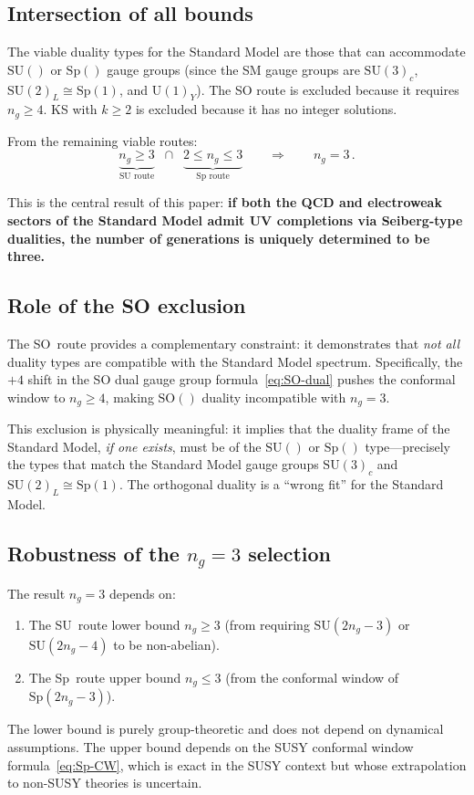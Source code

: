 \documentclass[11pt,a4paper]{article}
\theoremstyle{plain}
\theoremstyle{definition}
\theoremstyle{remark}
\newcommand{\ngen}{n_g}
\newcommand{\SU}[1]{\mathrm{SU}(#1)}
\newcommand{\UU}[1]{\mathrm{U}(#1)}
\newcommand{\SO}[1]{\mathrm{SO}(#1)}
\newcommand{\Sp}[1]{\mathrm{Sp}(#1)}
\begin{document}
\subsection{Intersection of all bounds}

The viable duality types for the Standard Model are those that can
accommodate $\SU{}$ or $\Sp{}$ gauge groups (since the SM gauge groups
are $\SU{3}_c$, $\SU{2}_L \cong \Sp{1}$, and $\UU{1}_Y$).  The SO
route is excluded because it requires $\ngen \geq 4$.  KS with $k \geq 2$
is excluded because it has no integer solutions.

From the remaining viable routes:
\begin{equation}\label{eq:intersection}
  \underbrace{\ngen \geq 3}_{\text{SU route}}
  \;\;\cap\;\;
  \underbrace{2 \leq \ngen \leq 3}_{\text{Sp route}}
  \qquad\Longrightarrow\qquad
  \boxed{\ngen = 3}\,.
\end{equation}

This is the central result of this paper: \textbf{if both the QCD and
electroweak sectors of the Standard Model admit UV completions via
Seiberg-type dualities, the number of generations is uniquely determined
to be three.}

\subsection{Role of the SO exclusion}

The SO~route provides a complementary constraint: it demonstrates that
\emph{not all} duality types are compatible with the Standard Model
spectrum.  Specifically, the $+4$ shift in the SO dual gauge group
formula~\eqref{eq:SO-dual} pushes the conformal window to $\ngen \geq 4$,
making $\SO{}$ duality incompatible with $\ngen = 3$.

This exclusion is physically meaningful: it implies that the duality
frame of the Standard Model, \emph{if one exists}, must be of the
$\SU{}$ or $\Sp{}$ type---precisely the types that match the Standard
Model gauge groups $\SU{3}_c$ and $\SU{2}_L \cong \Sp{1}$.  The
orthogonal duality is a ``wrong fit'' for the Standard Model.

\subsection{Robustness of the $\ngen = 3$ selection}

The result $\ngen = 3$ depends on:
\begin{enumerate}
  \item The SU~route lower bound $\ngen \geq 3$ (from requiring
    $\SU{2\ngen - 3}$ or $\SU{2\ngen - 4}$ to be non-abelian).
  \item The Sp~route upper bound $\ngen \leq 3$ (from the conformal
    window of $\Sp{2\ngen - 3}$).
\end{enumerate}
The lower bound is purely group-theoretic and does not depend on
dynamical assumptions.  The upper bound depends on the SUSY conformal
window formula~\eqref{eq:Sp-CW}, which is exact in the SUSY context
but whose extrapolation to non-SUSY theories is uncertain.
\end{document}
